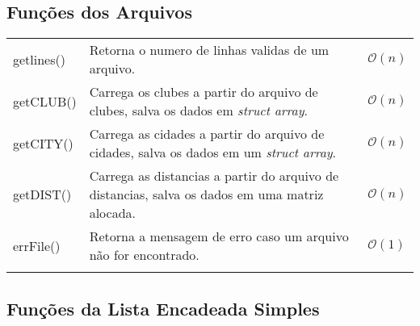 \documentclass[12pt,a4paper]{article}
\numberwithin{figure}{section}
\numberwithin{table}{section}
\begin{document}
\subsection{Funções dos Arquivos}

\begin{longtable}{>{\ttfamily}p{3cm} p{11cm} p{1cm}}
	getlines() & Retorna o numero de linhas validas de um arquivo. & $\mathcal{O}(n)$ \\
	getCLUB() & Carrega os clubes a partir do arquivo de clubes, salva os dados em \textit{struct array}. & $\mathcal{O}(n)$ \\
	getCITY() & Carrega as cidades a partir do arquivo de cidades, salva os dados em um \textit{struct array}. & $\mathcal{O}(n)$ \\
	getDIST() & Carrega as distancias a partir do arquivo de distancias, salva os dados em uma matriz alocada. & $\mathcal{O}(n)$ \\
	errFile() & Retorna a mensagem de erro caso um arquivo não for encontrado. & $\mathcal{O}(1)$ \\
	\label{tab:files}
\end{longtable}
\vspace{-0.5cm}

\subsection{Funções da Lista Encadeada Simples}
\end{document}
